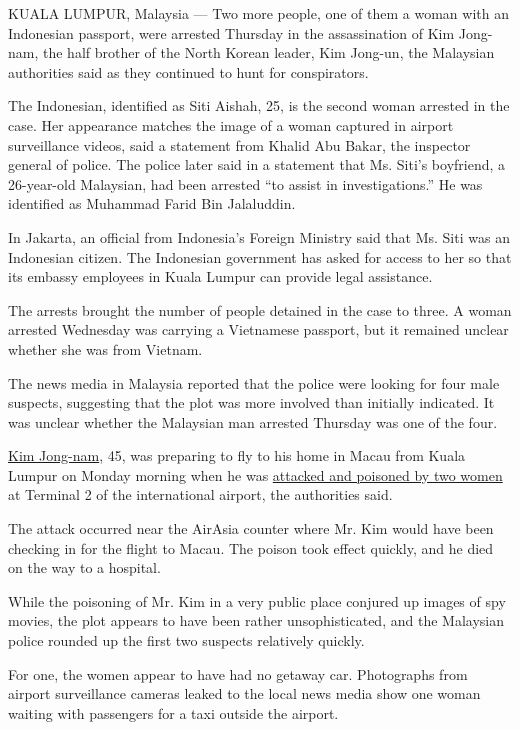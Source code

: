 KUALA LUMPUR, Malaysia --- Two more people, one of them a woman with an
Indonesian passport, were arrested Thursday in the assassination of Kim
Jong-nam, the half brother of the North Korean leader, Kim Jong-un, the
Malaysian authorities said as they continued to hunt for conspirators.

The Indonesian, identified as Siti Aishah, 25, is the second woman
arrested in the case. Her appearance matches the image of a woman
captured in airport surveillance videos, said a statement from Khalid
Abu Bakar, the inspector general of police. The police later said in a
statement that Ms. Siti's boyfriend, a 26-year-old Malaysian, had been
arrested ``to assist in investigations.'' He was identified as Muhammad
Farid Bin Jalaluddin.

In Jakarta, an official from Indonesia's Foreign Ministry said that Ms.
Siti was an Indonesian citizen. The Indonesian government has asked for
access to her so that its embassy employees in Kuala Lumpur can provide
legal assistance.

The arrests brought the number of people detained in the case to three.
A woman arrested Wednesday was carrying a Vietnamese passport, but it
remained unclear whether she was from Vietnam.

The news media in Malaysia reported that the police were looking for
four male suspects, suggesting that the plot was more involved than
initially indicated. It was unclear whether the Malaysian man arrested
Thursday was one of the four.

\href{https://www.nytimes.com/2017/02/15/world/asia/kim-jong-nam-assassination-north-korea.html}{Kim
Jong-nam}, 45, was preparing to fly to his home in Macau from Kuala
Lumpur on Monday morning when he was
\href{https://www.nytimes.com/2017/02/14/world/asia/kim-jong-un-brother-killed-malaysia.html}{attacked
and poisoned by two women} at Terminal 2 of the international airport,
the authorities said.

The attack occurred near the AirAsia counter where Mr. Kim would have
been checking in for the flight to Macau. The poison took effect
quickly, and he died on the way to a hospital.

While the poisoning of Mr. Kim in a very public place conjured up images
of spy movies, the plot appears to have been rather unsophisticated, and
the Malaysian police rounded up the first two suspects relatively
quickly.

For one, the women appear to have had no getaway car. Photographs from
airport surveillance cameras leaked to the local news media show one
woman waiting with passengers for a taxi outside the airport.

